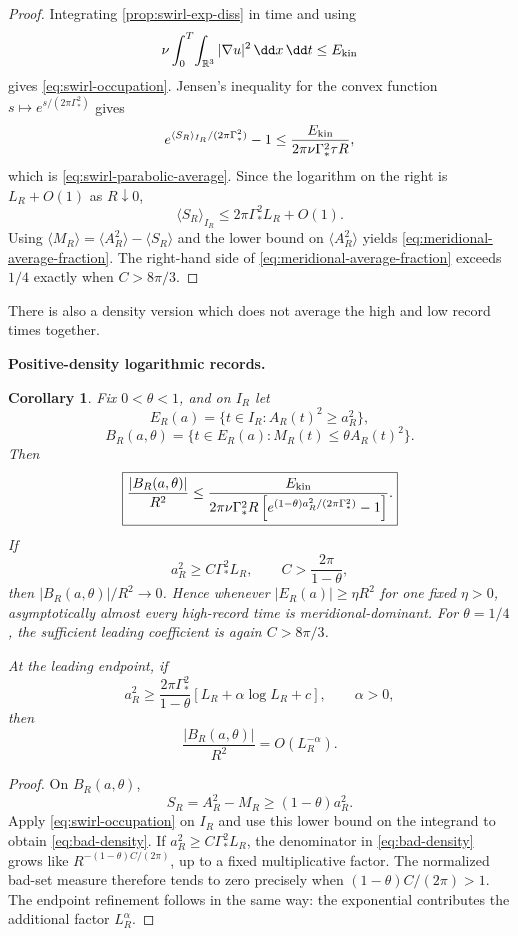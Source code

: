 \documentclass[11pt]{article}
\newtheorem{corollary}[theorem]{Corollary}
\theoremstyle{definition}\newtheorem{definition}[theorem]{Definition}
\theoremstyle{remark}\newtheorem{remark}[theorem]{Remark}
\begin{document}
\begin{proof}
Integrating \cref{prop:swirl-exp-diss} in time and using
\[
 \nu\int_0^T\!\int_{\mathbb R^3}|\nabla u|^2\,\dd x\,\dd t
 \le E_{\rm kin}
\]
gives \eqref{eq:swirl-occupation}.  Jensen's inequality for the convex function
\(s\mapsto e^{s/(2\pi\Gamma_*^2)}\) gives
\[
 e^{\langle S_R\rangle_{I_R}/(2\pi\Gamma_*^2)}-1
 \le
 \frac{E_{\rm kin}}
 {2\pi\nu\Gamma_*^2\tau R},
\]
which is \eqref{eq:swirl-parabolic-average}.  Since the logarithm on the right is
\(L_R+O(1)\) as \(R\downarrow0\),
\[
 \langle S_R\rangle_{I_R}
 \le2\pi\Gamma_*^2L_R+O(1).
\]
Using
\(\langle M_R\rangle=\langle A_R^2\rangle-\langle S_R\rangle\)
and the lower bound on \(\langle A_R^2\rangle\) yields \eqref{eq:meridional-average-fraction}.
The right-hand side of \eqref{eq:meridional-average-fraction} exceeds \(1/4\) exactly when
\(C>8\pi/3\).
\end{proof}

There is also a density version which does not average the high and low
record times together.

\medskip
\noindent\textbf{Positive-density logarithmic records.}
\begin{corollary}\label{cor:positive-density-routing}
Fix \(0<\theta<1\), and on \(I_R\) let
\[
 E_R(a)=\{t\in I_R:A_R(t)^2\ge a_R^2\},
\]
\[
 B_R(a,\theta)
 =
 \{t\in E_R(a):M_R(t)\le\theta A_R(t)^2\}.
\]
Then
\begin{equation}\label{eq:bad-density}
 \boxed{
 \frac{|B_R(a,\theta)|}{R^2}
 \le
 \frac{E_{\rm kin}}
 {2\pi\nu\Gamma_*^2 R
 \left[
 e^{(1-\theta)a_R^2/(2\pi\Gamma_*^2)}-1
 \right]}.
 }
\end{equation}
If
\[
 a_R^2\ge C\Gamma_*^2L_R,
 \qquad
 C>\frac{2\pi}{1-\theta},
\]
then \(|B_R(a,\theta)|/R^2\to0\).  Hence whenever
\(|E_R(a)|\ge\eta R^2\) for one fixed \(\eta>0\), asymptotically almost every
high-record time is meridional-dominant.  For \(\theta=1/4\), the sufficient
leading coefficient is again \(C>8\pi/3\).

At the leading endpoint, if
\[
 a_R^2
 \ge
 \frac{2\pi\Gamma_*^2}{1-\theta}
 \left[
 L_R+\alpha\log L_R+c
 \right],
 \qquad \alpha>0,
\]
then
\begin{equation}\label{eq:bad-density-endpoint}
 \frac{|B_R(a,\theta)|}{R^2}=O(L_R^{-\alpha}).
\end{equation}
\end{corollary}

\begin{proof}
On \(B_R(a,\theta)\),
\[
 S_R=A_R^2-M_R\ge(1-\theta)a_R^2.
\]
Apply \eqref{eq:swirl-occupation} on \(I_R\) and use this lower bound on the integrand to
obtain \eqref{eq:bad-density}.  If
\(a_R^2\ge C\Gamma_*^2L_R\), the denominator in \eqref{eq:bad-density} grows like
\(R^{-(1-\theta)C/(2\pi)}\), up to a fixed multiplicative factor.  The
normalized bad-set measure therefore tends to zero precisely when
\((1-\theta)C/(2\pi)>1\).  The endpoint refinement follows in the same way:
the exponential contributes the additional factor \(L_R^\alpha\).
\end{proof}
\end{document}

